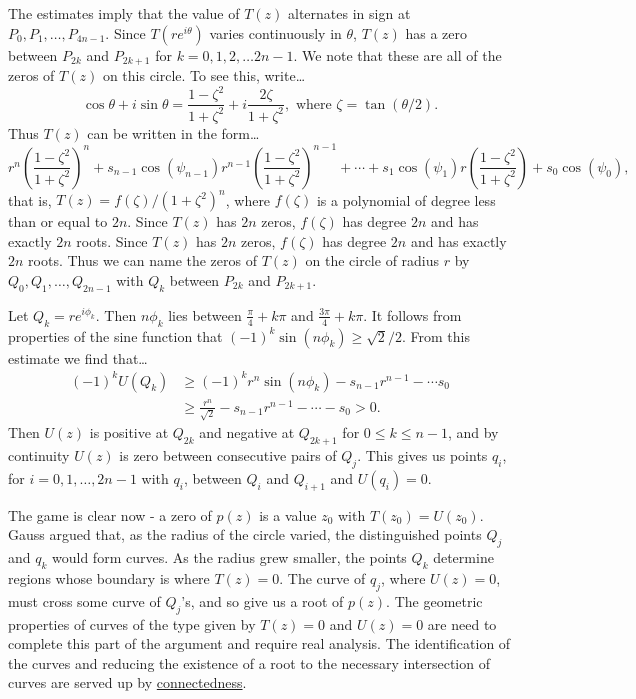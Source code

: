 The estimates imply that the value of $T(z)$ alternates in sign at $P_0, P_1, \dots, P_{4n-1}$. Since $T(re^{i \theta})$ varies continuously in $\theta$,
$T(z)$ has a zero between $P_{2k}$ and $P_{2k+1}$ for $k = 0, 1, 2, \dots 2n-1$. We note that these are all of the zeros of $T(z)$ on this circle. To see this,
write\dots
$$\cos \theta + i \sin \theta = \frac{1 - \zeta^2}{1 + \zeta^2} + i \frac{2\zeta}{1 + \zeta^2}, \textrm{ where } \zeta = \tan(\theta/2).$$
Thus $T(z)$ can be written in the form\dots
$$r^n\left( \frac{1-\zeta^2}{1 + \zeta^2} \right)^n + s_{n-1}\cos(\psi_{n-1})r^{n-1}\left( \frac{1-\zeta^2}{1 + \zeta^2} \right)^{n-1} + \cdots + s_{1}\cos(\psi_{1})r\left( \frac{1-\zeta^2}{1 + \zeta^2} \right) + s_0 \cos(\psi_0),$$
that is, $T(z) = f(\zeta)/(1 + \zeta^2)^n$, where $f(\zeta)$ is a polynomial of degree less than or equal to $2n$. Since $T(z)$ has $2n$ zeros, $f(\zeta)$ has degree $2n$ and has exactly $2n$ roots. Since $T(z)$ has $2n$ zeros, $f(\zeta)$
has degree $2n$ and has exactly $2n$ roots. Thus we can name the zeros of $T(z)$ on the circle of radius $r$ by $Q_0, Q_1, \dots, Q_{2n - 1}$ with $Q_k$ between $P_{2k}$ and $P_{2k+1}$.

Let $Q_k = re^{i \phi_k}$. Then $n \phi_k$ lies between $\frac{\pi}{4} + k \pi$ and $\frac{3\pi}{4} + k\pi$.
It follows from properties of the sine function that $(-1)^k \sin(n \phi_k) \geq \sqrt{2}/2$. From this estimate we find that\dots
\begin{align*}
(-1)^kU(Q_k) &\geq (-1)^kr^n\sin(n \phi_k) - s_{n-1} r^{n-1} - \cdots s_0\\
			 &\geq \frac{r^n}{\sqrt{2}} - s_{n-1}r^{n-1} - \cdots - s_0 > 0.
\end{align*}
Then $U(z)$ is positive at $Q_{2k}$ and negative at $Q_{2k+1}$ for $0 \leq k \leq n-1$, and by continuity $U(z)$ is zero between consecutive pairs of $Q_j$. This gives us points $q_i$, for $i = 0,1,\dots,2n-1$ with $q_i$, between $Q_i$
and $Q_{i+1}$ and $U(q_i) = 0$.

The game is clear now - a zero of $p(z)$ is a value $z_0$ with $T(z_0) = U(z_0)$. Gauss argued that, as the radius of the circle varied, the distinguished points $Q_j$ and $q_k$ would form curves. As the radius grew smaller, the points $Q_k$
determine regions whose boundary is where $T(z) = 0$. The curve of $q_j$, where $U(z) = 0$, must cross some curve of $Q_j$'s, and so give us a root of $p(z)$. The geometric properties of curves of the type given by $T(z) = 0$ and $U(z) = 0$
are need to complete this part of the argument and require real analysis. The identification of the curves and reducing the existence of a root to the necessary intersection of curves are served up by \hyperref[connectedness]{connectedness}.
